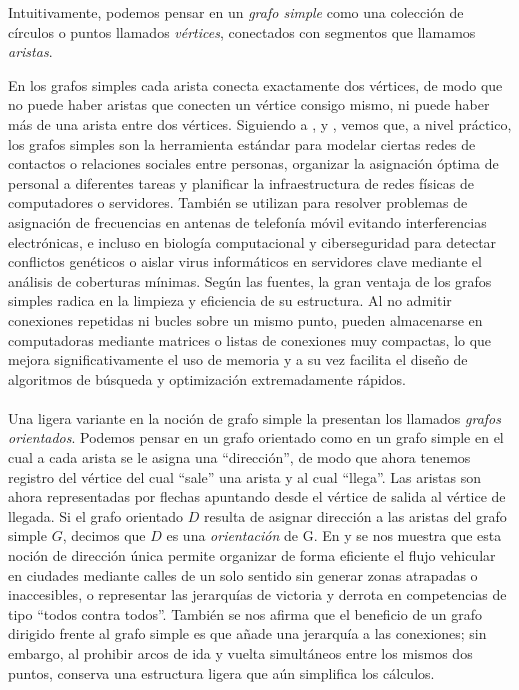Intuitivamente, podemos pensar en un \textit{grafo simple} como una colección de círculos o puntos llamados \textit{vértices}, conectados con segmentos que llamamos \textit{aristas}.

En los grafos simples cada arista conecta exactamente dos vértices, de modo que no puede haber aristas que conecten un vértice consigo mismo, ni puede haber más de una arista entre dos vértices. Siguiendo a \cite{Foulds1991}, \cite{Gross2006} y \cite{Pirzada2007}, vemos que, a nivel práctico, los grafos simples son la herramienta estándar para modelar ciertas redes de contactos o relaciones sociales entre personas, organizar la asignación óptima de personal a diferentes tareas y planificar la infraestructura de redes físicas de computadores o servidores. También se utilizan para resolver problemas de asignación de frecuencias en antenas de telefonía móvil evitando interferencias electrónicas, e incluso en biología computacional y ciberseguridad para detectar conflictos genéticos o aislar virus informáticos en servidores clave mediante el análisis de coberturas mínimas. Según las fuentes, la gran ventaja de los grafos simples radica en la limpieza y eficiencia de su estructura. Al no admitir conexiones repetidas ni bucles sobre un mismo punto, pueden almacenarse en computadoras mediante matrices o listas de conexiones muy compactas, lo que mejora significativamente el uso de memoria y a su vez facilita el diseño de algoritmos de búsqueda y optimización extremadamente rápidos.\\\\
Una ligera variante en la noción de grafo simple la presentan los llamados \textit{grafos orientados}. Podemos pensar en un grafo orientado como en un grafo simple en el cual a cada arista se le asigna una ``dirección'', de modo que ahora tenemos registro del vértice del cual ``sale'' una arista y al cual ``llega''. Las aristas son ahora representadas por flechas apuntando desde el vértice de salida al vértice de llegada. Si el grafo orientado $D$ resulta de asignar dirección a las aristas del grafo simple $G$, decimos que $D$ es una \textit{orientación} de G.
\clearpage
En \cite{Foulds1991} y \cite{Roberts1978} se nos muestra que esta noción de dirección única permite organizar de forma eficiente el flujo vehicular en ciudades mediante calles de un solo sentido sin generar zonas atrapadas o inaccesibles, o representar las jerarquías de victoria y derrota en competencias de tipo ``todos contra todos''. También se nos afirma que el beneficio de un grafo dirigido frente al grafo simple es que añade una jerarquía a las conexiones; sin embargo, al prohibir arcos de ida y vuelta simultáneos entre los mismos dos puntos, conserva una estructura ligera que aún simplifica los cálculos.\\\\

